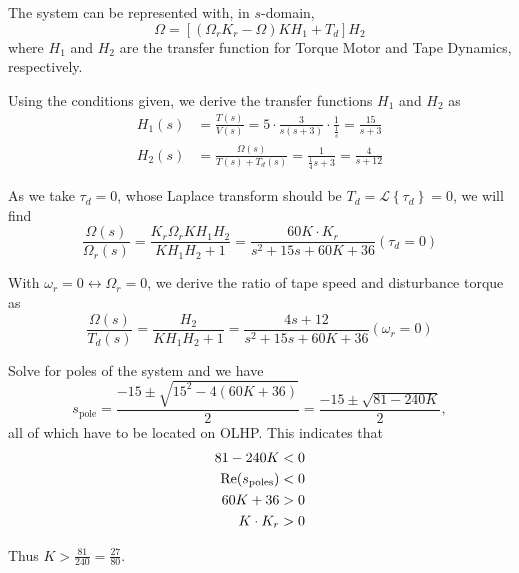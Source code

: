 
    The system can be represented with, in $s$-domain,
    \begin{equation}
        \Omega = \left[(\Omega_r K_r - \Omega)KH_1+T_d\right]H_2
    \end{equation}
    where $H_1$ and $H_2$ are the transfer function for Torque Motor and Tape Dynamics, respectively.

    Using the conditions given, we derive the transfer functions $H_1$ and $H_2$ as
    \begin{align}
        H_1(s) &= \frac{T(s)}{V(s)} = 5\cdot \frac{3}{s(s+3)} \cdot \frac{1}{\frac{1}{s}}=\frac{15}{s+3} \\
        H_2(s) &= \frac{\Omega(s)}{T(s)+T_d(s)} = \frac{1}{\frac{1}{4}s+3} = \frac{4}{s+12}
    \end{align}

    As we take $\tau_d=0$, whose Laplace transform should be $T_d = \mathcal{L} \left\lbrace \tau_d \right\rbrace = 0$, we will find
    \begin{equation}
        \frac{\Omega(s)}{\Omega_r(s)} = \frac{K_r\Omega_r K H_1 H_2}{K H_1 H_2 +1} = \boxed{\frac{60K\cdot K_r}{s^2+15s+60K+36}} (\tau_d = 0)
        \label{eq-omega-r}
    \end{equation}

    With $\omega_r=0 \leftrightarrow \Omega_r = 0$, we derive the ratio of tape speed and disturbance torque as 
    \begin{equation}
        \frac{\Omega(s)}{T_d(s)}=\frac{H_2}{KH_1 H_2 +1} = \boxed{\frac{4s+12}{s^2 +15s+60K+36}} (\omega_r = 0)\label{eq-omega}
    \end{equation}


    Solve for poles of the system and we have
    \begin{equation}
        s_{\text{pole}}=\frac{-15\pm \sqrt{15^2-4(60K+36)}}{2}=\frac{-15\pm \sqrt{81-240K}}{2},
    \end{equation}
    all of which have to be located on OLHP. This indicates that 
    \begin{align}
            81-240K &< 0 \\
            \Re(s_{\text{poles}}) &< 0 \\
            60K+36&>0 \notag \\
            K\cdot K_r &>0 \notag
    \end{align}
    
    Thus $\boxed{K>\frac{81}{240}=\frac{27}{80}}$.

